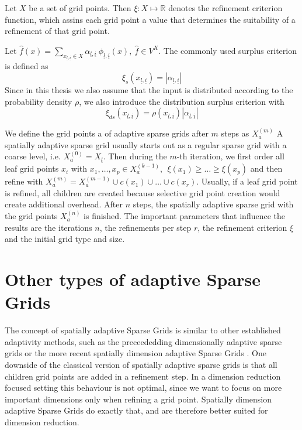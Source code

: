 \documentclass[
  a4paper,  %
  twoside,  %
  bibliography=totoc,
  headsepline,
  cleardoublepage=empty,
  parskip=half,
  draft=false
]{scrbook}
\begin{document}
\begin{definition}
Let $X$ be a set of grid points.
Then $\xi \colon X \mapsto \mathds{R}$ denotes the refinement criterion function, which assins each grid point a value that determines the suitability of a refinement of that grid point.

Let $\hat{f}(x) = \sum_{x_{\underline{l},\underline{i}} \in X} \alpha_{\underline{l},\underline{i}} ~ \phi_{
\underline{l},\underline{i}}(x), ~\hat{f} \in V^X$.
The commonly used surplus criterion is defined as
\begin{equation}
\xi_s(x_{\underline{l},\underline{i}}) = |\alpha_{\underline{l},\underline{i}}|
\end{equation}
Since in this thesis we also assume that the input is distributed according to the probability density $\rho$, we also introduce the distribution surplus criterion with
\begin{equation}
\xi_{ds}(x_{\underline{l},\underline{i}}) =\rho(x_{\underline{l},\underline{i}}) |\alpha_{\underline{l},\underline{i}}|
\end{equation}
\end{definition}
We define the grid points a of adaptive sparse grids after $m$ steps as $X_a^{(m)}$
A spatially adaptive sparse grid usually starts out as a regular sparse grid with a coarse level, i.e. $X_a^{(0)}=X_{\underline{l}}$.
Then during the $m$-th iteration, we first order all leaf grid points $x_i$ with $x_1, \dots, x_p \in X_a^{(k-1)}, ~~ \xi(x_1) \geq \dots \geq \xi(x_p)$ and then refine with $X_a^{(m)}=X_a^{(m-1)} \cup c(x_1) \cup \dots \cup c(x_r)$.
Usually, if a leaf grid point is refined, all children are created because selective grid point creation would create additional overhead.
After $n$ steps, the spatially adaptive sparse grid with the grid points $X_a^{(n)}$ is finished.
The important parameters that influence the results are the iterations $n$, the refinements per step $r$, the refinement criterion $\xi$ and the initial grid type and size.

\section{Other types of adaptive Sparse Grids}

The concept of spatially adaptive Sparse Grids is similar to other established adaptivity methods, such as the preceededding dimensionally adaptive sparse grids \cite{} or the more recent spatially dimension adaptive Sparse Grids \cite{}.
One downside of the classical version of spatially adaptive sparse grids is that all children grid points are added in a refinement step.
In a dimension reduction focused setting this behaviour is not optimal, since we want to focus on more important dimensions only when refining a grid point.
Spatially dimension adaptive Sparse Grids do exactly that, and are therefore better suited for dimension reduction.
\end{document}
